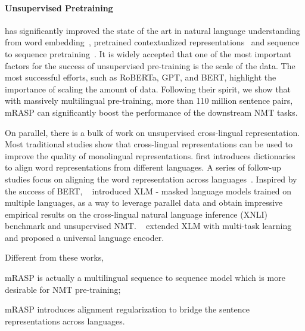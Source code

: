 \documentclass[11pt,a4paper]{article}
\newcommand{\method}{mRASP\xspace}
\begin{document}
\paragraph{Unsupervised Pretraining}  has
significantly improved the state of the art in natural language understanding from word embedding~\cite{mikolov2013distributed,pennington2014glove}, pretrained contextualized representations~\cite{DBLP:conf/naacl/PetersNIGCLZ18,radford2019language,DBLP:conf/naacl/DevlinCLT19} and sequence to sequence pretraining~\cite{DBLP:conf/icml/SongTQLL19}. 
It is widely accepted that one of the most important factors for the success of unsupervised pre-training is the scale of the data. 
The most successful efforts, such as RoBERTa, GPT, and BERT, highlight the importance of scaling the amount of data. 
Following their spirit,  we show that with massively multilingual pre-training, more than 110 million sentence pairs, \method can significantly boost the performance of the downstream NMT tasks. 

On parallel, there is a bulk of work on unsupervised cross-lingual representation.  
Most traditional studies show that cross-lingual
representations can be used to improve the quality of monolingual representations. 
\citet{mikolov2013exploiting} first introduces dictionaries to align
word representations from different languages. 
A series of follow-up studies focus on aligning the word representation across languages~\cite{xing2015normalized,ammar2016massively,smith2017offline,conneau2017word}. 
Inspired by the success of BERT, ~\citet{DBLP:conf/nips/ConneauL19} introduced XLM - masked language models trained on multiple languages, as a way to leverage parallel data and obtain impressive empirical results on the cross-lingual natural language inference
(XNLI) benchmark and unsupervised NMT\cite{DBLP:conf/acl/SennrichHB16,DBLP:conf/iclr/LampleCDR18,DBLP:journals/corr/abs-2002-02955}. 
~\citet{huang2019unicoder} extended XLM with multi-task learning and proposed a universal language encoder. 

Different from these works,  
\begin{inparaenum}[\it a)]
    \item \method is actually a multilingual sequence to sequence model which is more desirable for  NMT pre-training;
    \item \method  introduces alignment regularization to bridge the sentence representations across languages.  
\end{inparaenum} 
\end{document}
